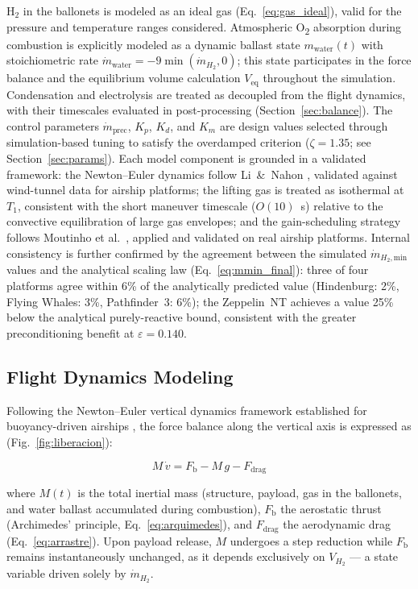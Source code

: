 \documentclass[applsci,article,submit,pdftex,moreauthors]{Definitions/mdpi}
\newcommand{\dotmH}{\dot{m}_{H_2}}
\newcommand{\dotmmin}{\dot{m}_{H_2,\text{min}}}
\newcommand{\added}[1]{#1}
\begin{document}
\added{H$_2$ in the ballonets is modeled as an ideal gas (Eq.~\eqref{eq:gas_ideal}), valid for the pressure and temperature ranges considered. Atmospheric O\textsubscript{2} absorption during combustion is explicitly modeled as a dynamic ballast state $m_\text{water}(t)$ with stoichiometric rate $\dot{m}_\text{water} = -9\min(\dotmH,0)$; this state participates in the force balance and the equilibrium volume calculation $V_\text{eq}$ throughout the simulation. Condensation and electrolysis are treated as decoupled from the flight dynamics, with their timescales evaluated in post-processing (Section~\ref{sec:balance}). The control parameters $\dot{m}_\text{prec}$, $K_p$, $K_d$, and $K_m$ are design values selected through simulation-based tuning to satisfy the overdamped criterion ($\zeta = 1.35$; see Section~\ref{sec:params}). Each model component is grounded in a validated framework: the Newton--Euler dynamics follow Li~\&~Nahon \cite{Li2007}, validated against wind-tunnel data for airship platforms; the lifting gas is treated as isothermal at $T_1$, consistent with the short maneuver timescale ($O(10)$~s) relative to the convective equilibration of large gas envelopes; and the gain-scheduling strategy follows Moutinho et al.\ \cite{Azinheira2016}, applied and validated on real airship platforms. Internal consistency is further confirmed by the agreement between the simulated $\dotmmin$ values and the analytical scaling law (Eq.~\eqref{eq:mmin_final}): three of four platforms agree within 6\% of the analytically predicted value (Hindenburg: 2\%, Flying Whales: 3\%, Pathfinder~3: 6\%); the Zeppelin~NT achieves a value 25\% below the analytical purely-reactive bound, consistent with the greater preconditioning benefit at $\varepsilon = 0.140$.}

\subsection{Flight Dynamics Modeling}
Following the Newton--Euler vertical dynamics framework established for buoyancy-driven airships \cite{Wu2013, Li2007}, the force balance along the vertical axis is expressed as (Fig.~\ref{fig:liberacion}):

\begin{equation}
M\,\dot{v} = F_\text{b} - M\,g - F_\text{drag}
\label{eq:newton}
\end{equation}

where $M(t)$ is the total inertial mass (structure, payload, gas in the ballonets, and water ballast accumulated during combustion),
$F_\text{b}$ the aerostatic thrust (Archimedes' principle, Eq.~\eqref{eq:arquimedes}),
and $F_\text{drag}$ the aerodynamic drag (Eq.~\eqref{eq:arrastre}). Upon payload release,
$M$ undergoes a step reduction while $F_\text{b}$ remains instantaneously unchanged, as it
depends exclusively on $V_{H_2}$ --- a state variable driven solely by $\dot{m}_{H_2}$.
\end{document}
